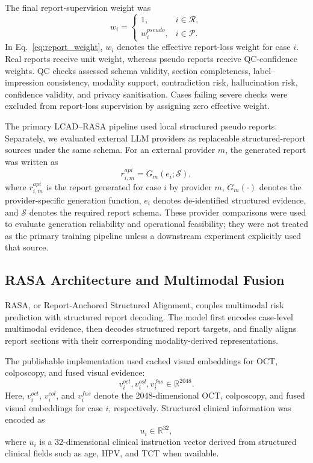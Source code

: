 The final report-supervision weight was
\begin{equation}
w_i=
\begin{cases}
1, & i\in\mathcal{R},\\
w_i^{pseudo}, & i\in\mathcal{P}.
\end{cases}
\label{eq:report_weight}
\end{equation}
In Eq.~\eqref{eq:report_weight}, \(w_i\) denotes the effective report-loss weight for case \(i\). Real reports receive unit weight, whereas pseudo reports receive QC-confidence weights. QC checks assessed schema validity, section completeness, label--impression consistency, modality support, contradiction risk, hallucination risk, confidence validity, and privacy sanitisation. Cases failing severe checks were excluded from report-loss supervision by assigning zero effective weight.

The primary LCAD--RASA pipeline used local structured pseudo reports. Separately, we evaluated external LLM providers as replaceable structured-report sources under the same schema. For an external provider \(m\), the generated report was written as
\begin{equation}
r_{i,m}^{api}=G_m(e_i;\mathcal{S}),
\label{eq:api_generation}
\end{equation}
where \(r_{i,m}^{api}\) is the report generated for case \(i\) by provider \(m\), \(G_m(\cdot)\) denotes the provider-specific generation function, \(e_i\) denotes de-identified structured evidence, and \(\mathcal{S}\) denotes the required report schema. These provider comparisons were used to evaluate generation reliability and operational feasibility; they were not treated as the primary training pipeline unless a downstream experiment explicitly used that source.

\subsection{RASA Architecture and Multimodal Fusion}
\label{subsec:methods_rasa}

RASA, or Report-Anchored Structured Alignment, couples multimodal risk prediction with structured report decoding. The model first encodes case-level multimodal evidence, then decodes structured report targets, and finally aligns report sections with their corresponding modality-derived representations.

The publishable implementation used cached visual embeddings for OCT, colposcopy, and fused visual evidence:
\begin{equation}
v_i^{oct},v_i^{col},v_i^{fus}\in\mathbb{R}^{2048}.
\label{eq:visual_embeddings}
\end{equation}
Here, \(v_i^{oct}\), \(v_i^{col}\), and \(v_i^{fus}\) denote the 2048-dimensional OCT, colposcopy, and fused visual embeddings for case \(i\), respectively. Structured clinical information was encoded as
\begin{equation}
u_i\in\mathbb{R}^{32},
\label{eq:clinical_vector}
\end{equation}
where \(u_i\) is a 32-dimensional clinical instruction vector derived from structured clinical fields such as age, HPV, and TCT when available.

